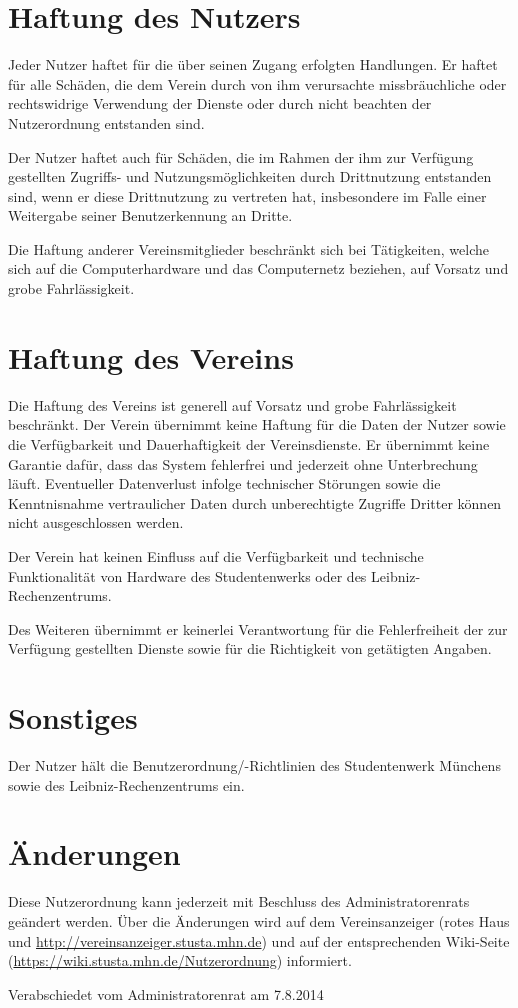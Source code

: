 \documentclass[a4paper,10pt]{scrartcl}
\begin{document}
\section{Haftung des Nutzers}
Jeder Nutzer haftet für die über seinen Zugang erfolgten Handlungen. Er haftet für alle Schäden, die dem Verein durch von ihm verursachte missbräuchliche oder rechtswidrige Verwendung der Dienste oder durch nicht beachten der Nutzerordnung entstanden sind.

Der Nutzer haftet auch für Schäden, die im Rahmen der ihm zur Verfügung gestellten Zugriffs- und Nutzungsmöglichkeiten durch Drittnutzung entstanden sind, wenn er diese Drittnutzung zu vertreten hat, insbesondere im Falle einer Weitergabe seiner Benutzerkennung an Dritte.

Die Haftung anderer Vereinsmitglieder beschränkt sich bei Tätigkeiten, welche sich auf die Computerhardware und das Computernetz beziehen, auf Vorsatz und grobe Fahrlässigkeit.

\section{Haftung des Vereins}
Die Haftung des Vereins ist generell auf Vorsatz und grobe Fahrlässigkeit beschränkt. Der Verein übernimmt keine Haftung für die Daten der Nutzer sowie die Verfügbarkeit und Dauerhaftigkeit der Vereinsdienste. Er übernimmt keine Garantie dafür, dass das System fehlerfrei und jederzeit ohne Unterbrechung läuft. Eventueller Datenverlust infolge technischer Störungen sowie die Kenntnisnahme vertraulicher Daten durch unberechtigte Zugriffe Dritter können nicht ausgeschlossen werden.

Der Verein hat keinen Einfluss auf die Verfügbarkeit und technische Funktionalität von Hardware des Studentenwerks oder des Leibniz-Rechenzentrums.

Des Weiteren übernimmt er keinerlei Verantwortung für die Fehlerfreiheit der zur Verfügung gestellten Dienste sowie für die Richtigkeit von getätigten Angaben.

\section{Sonstiges}
Der Nutzer hält die Benutzerordnung/-Richtlinien des Studentenwerk Münchens sowie des Leibniz-Rechenzentrums ein.

\section{Änderungen}
Diese Nutzerordnung kann jederzeit mit Beschluss des Administratorenrats geändert werden. Über die Änderungen wird auf dem Vereinsanzeiger (rotes Haus und \url{http://vereinsanzeiger.stusta.mhn.de}) und auf der entsprechenden Wiki-Seite (\url{https://wiki.stusta.mhn.de/Nutzerordnung}) informiert. 

\hfill Verabschiedet vom Administratorenrat am 7.8.2014
\end{document}
